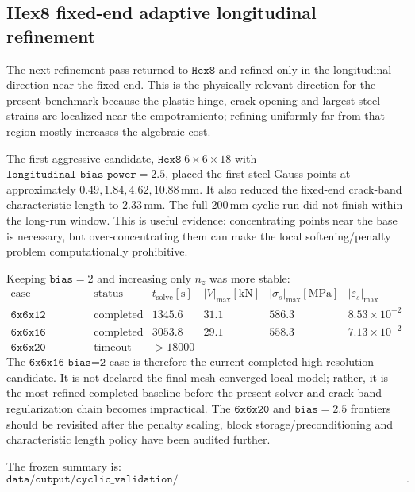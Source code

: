 \subsection{Hex8 fixed-end adaptive longitudinal refinement}

The next refinement pass returned to \(\texttt{Hex8}\) and refined only in the
longitudinal direction near the fixed end. This is the physically relevant
direction for the present benchmark because the plastic hinge, crack opening
and largest steel strains are localized near the empotramiento; refining
uniformly far from that region mostly increases the algebraic cost.

The first aggressive candidate,
\(\texttt{Hex8}\;6\times6\times18\) with
\(\texttt{longitudinal\_bias\_power}=2.5\), placed the first steel Gauss
points at approximately \(0.49,1.84,4.62,10.88\,\mathrm{mm}\). It also reduced
the fixed-end crack-band characteristic length to
\(2.33\,\mathrm{mm}\). The full \(200\,\mathrm{mm}\) cyclic run did not finish
within the long-run window. This is useful evidence: concentrating points near
the base is necessary, but over-concentrating them can make the local
softening/penalty problem computationally prohibitive.

Keeping \(\texttt{bias}=2\) and increasing only \(n_z\) was more stable:
\[
\begin{array}{l|c|r|r|r|r}
\text{case} & \text{status} & t_{\mathrm{solve}}[\mathrm{s}] &
|V|_{\max}[\mathrm{kN}] & |\sigma_s|_{\max}[\mathrm{MPa}] &
|\varepsilon_s|_{\max}\\
\hline
\texttt{6x6x12 bias=2} & \text{completed} & 1345.6 & 31.1 & 586.3 & 8.53\times10^{-2}\\
\texttt{6x6x16 bias=2} & \text{completed} & 3053.8 & 29.1 & 558.3 & 7.13\times10^{-2}\\
\texttt{6x6x20 bias=2} & \text{timeout} & >18000 & - & - & -
\end{array}
\]
The \(\texttt{6x6x16 bias=2}\) case is therefore the current completed
high-resolution candidate. It is not declared the final mesh-converged local
model; rather, it is the most refined completed baseline before the present
solver and crack-band regularization chain becomes impractical. The
\(\texttt{6x6x20}\) and \(\texttt{bias}=2.5\) frontiers should be revisited
after the penalty scaling, block storage/preconditioning and characteristic
length policy have been audited further.

The frozen summary is:
\[
\texttt{data/output/cyclic\_validation/reboot\_continuum\_hex8\_fixed\_end\_refinement\_audit/hex8\_fixed\_end\_refinement\_summary.json}.
\]

